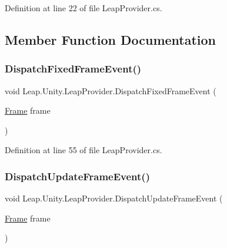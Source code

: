 Definition at line 22 of file Leap\+Provider.\+cs.



\subsection{Member Function Documentation}
\mbox{\label{class_leap_1_1_unity_1_1_leap_provider_af7fdbc4bae6cb0508424b8c3bdbb4ce1}} 
\subsubsection{\texorpdfstring{DispatchFixedFrameEvent()}{DispatchFixedFrameEvent()}}
{\footnotesize\ttfamily void Leap.\+Unity.\+Leap\+Provider.\+Dispatch\+Fixed\+Frame\+Event (\begin{DoxyParamCaption}\item[{\mbox{\hyperlink{class_leap_1_1_frame}{Frame}}}]{frame }\end{DoxyParamCaption})\hspace{0.3cm}{\ttfamily [protected]}}



Definition at line 55 of file Leap\+Provider.\+cs.

\mbox{\label{class_leap_1_1_unity_1_1_leap_provider_a2b90958e448e8f556d2b9c9af4a9547c}} 
\subsubsection{\texorpdfstring{DispatchUpdateFrameEvent()}{DispatchUpdateFrameEvent()}}
{\footnotesize\ttfamily void Leap.\+Unity.\+Leap\+Provider.\+Dispatch\+Update\+Frame\+Event (\begin{DoxyParamCaption}\item[{\mbox{\hyperlink{class_leap_1_1_frame}{Frame}}}]{frame }\end{DoxyParamCaption})\hspace{0.3cm}{\ttfamily [protected]}}



